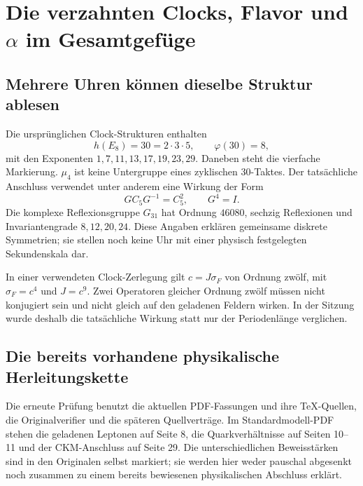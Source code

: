 \section{Die verzahnten Clocks, Flavor und $\alpha$ im Gesamtgefüge}

\subsection{Mehrere Uhren können dieselbe Struktur ablesen}
Die ursprünglichen Clock-Strukturen enthalten
\begin{equation}
h(E_8)=30=2\cdot3\cdot5,\qquad \varphi(30)=8,
\end{equation}
mit den Exponenten $1,7,11,13,17,19,23,29$. Daneben steht die vierfache Markierung. $\mu_4$ ist keine Untergruppe eines zyklischen 30-Taktes. Der tatsächliche Anschluss verwendet unter anderem eine Wirkung der Form
\begin{equation}
G C_5G^{-1}=C_5^2,\qquad G^4=I.
\end{equation}
Die komplexe Reflexionsgruppe $G_{31}$ hat Ordnung $46080$, sechzig Reflexionen und Invariantengrade $8,12,20,24$. Diese Angaben erklären gemeinsame diskrete Symmetrien; sie stellen noch keine Uhr mit einer physisch festgelegten Sekundenskala dar.

In einer verwendeten Clock-Zerlegung gilt $c=J\sigma_F$ von Ordnung zwölf, mit $\sigma_F=c^4$ und $J=c^9$. Zwei Operatoren gleicher Ordnung zwölf müssen nicht konjugiert sein und nicht gleich auf den geladenen Feldern wirken. In der Sitzung wurde deshalb die tatsächliche Wirkung statt nur der Periodenlänge verglichen.

\subsection{Die bereits vorhandene physikalische Herleitungskette}\label{sec:physicalconstraints}


Die erneute Prüfung benutzt die aktuellen PDF-Fassungen und ihre TeX-Quellen, die Originalverifier und die späteren Quellverträge. Im Standardmodell-PDF stehen die geladenen Leptonen auf Seite 8, die Quarkverhältnisse auf Seiten 10--11 und der CKM-Anschluss auf Seite 29. Die unterschiedlichen Beweisstärken sind in den Originalen selbst markiert; sie werden hier weder pauschal abgesenkt noch zusammen zu einem bereits bewiesenen physikalischen Abschluss erklärt.

